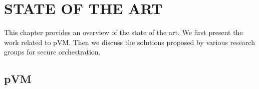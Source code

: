 \chapter{STATE OF THE ART}
\label{see:art}







This chapter provides an overview of the state of the art. We first present the work related to pVM. Then we discuss the solutions proposed by various research groups for secure orchestration.

\section{pVM}

